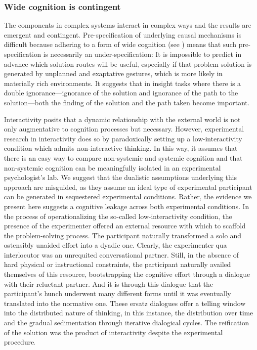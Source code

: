 \documentclass[twocolumn, issue, empirical, authordate,drafn]{jote-new-article}
\begin{document}
\subsubsection{Wide cognition is contingent}

The components in complex systems interact in complex ways and the results are emergent and contingent. Pre-specification of underlying causal mechanisms is difficult because adhering to a form of wide cognition (see ) means that such pre-specification is necessarily an under-specification: It is impossible to predict in advance which solution routes will be useful, especially if that problem solution is generated by unplanned and exaptative gestures, which is more likely in materially rich environments. It suggests that in insight tasks where there is a double ignorance---ignorance of the solution and ignorance of the path to the solution---both the finding of the solution and the path taken become important. 

Interactivity posits that a dynamic relationship with the external world is not only augmentative to cognition processes but necessary. However, experimental research in interactivity does so by paradoxically setting up a low-interactivity condition which admits non-interactive thinking. In this way, it assumes that there is an easy way to compare non-systemic and systemic cognition and that non-systemic cognition can be meaningfully isolated in an experimental psychologist's lab. We suggest that the dualistic assumptions underlying this approach are misguided, as they assume an ideal type of experimental participant can be generated in sequestered experimental conditions. Rather, the evidence we present here suggests a cognitive leakage across both experimental conditions. In the process of operationalizing the so-called low-interactivity condition, the presence of the experimenter offered an external resource with which to scaffold the problem-solving process. The participant naturally transformed a solo and ostensibly unaided effort into a dyadic one. Clearly, the experimenter qua interlocutor was an unrequited conversational partner. Still, in the absence of hard physical or instructional constraints, the participant naturally availed themselves of this resource, bootstrapping the cognitive effort through a dialogue with their reluctant partner. And it is through this dialogue that the participant's hunch underwent many different forms until it was eventually translated into the normative one. These ersatz dialogues offer a telling window into the distributed nature of thinking, in this instance, the distribution over time and the gradual sedimentation through iterative dialogical cycles. The reification of the solution was the product of interactivity despite the experimental procedure. 
\end{document}
